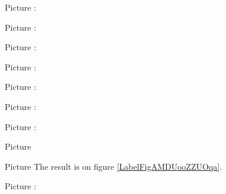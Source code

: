 Picture : 
\begin{center}
   
\end{center}


\clearpage

\huge
Picture : 
\begin{center}
   
\end{center}
\normalsize


Picture : 
\begin{center}
   
\end{center}



Picture : 
\begin{center}
   
\end{center}


Picture : 
\begin{center}
   
\end{center}


Picture : 
\begin{center}
   
\end{center}



Picture : 
\begin{center}
   
\end{center}



Picture 
\begin{center}
   
\end{center}

Picture 
The result is on figure \ref{LabelFigAMDUooZZUOqa}. %
\newcommand{\CaptionFigAMDUooZZUOqa}{<+Type your caption here+>}





Picture : 
\begin{center}
   
\end{center}

